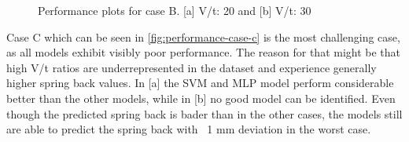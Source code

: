 \begin{figure}[h]
    \begin{tcolorbox}[arc=0pt,boxrule=0.5pt]
        \centering
        \caption{Performance plots for case B. [a] V/t: 20 and [b] V/t: 30 }
        \label{fig:performance-case-b}
    \end{tcolorbox}
\end{figure}


Case C which can be seen in \cref{fig:performance-case-c} is the most challenging case, as all models exhibit visibly
poor performance.
The reason for that might be that high V/t ratios are underrepresented in the dataset and experience generally higher
spring back values.
In [a] the SVM and MLP model perform considerable better than the other models, while in [b] no good model can be
identified.
Even though the predicted spring back is bader than in the other cases, the models still are able to predict the
spring back with ~1 mm deviation in the worst case.

